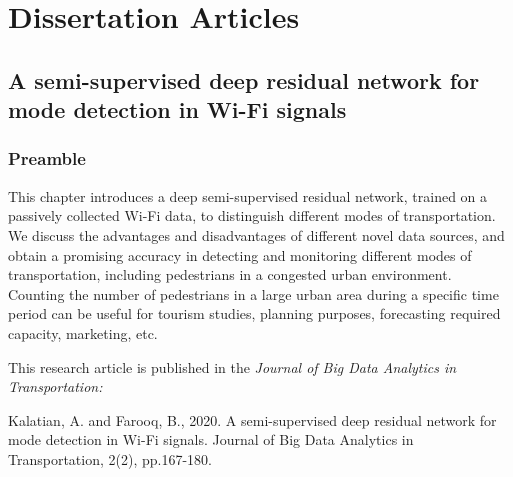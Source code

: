 \part{Dissertation Articles}
\label{part_2:dissertation_articles}
\chapter{A semi-supervised deep residual network for mode detection in Wi-Fi signals}
\label{chap2}
\thispagestyle{empty}
\pagebreak
\section*{Preamble}
This chapter introduces a deep semi-supervised residual network, trained on a passively collected Wi-Fi data, to distinguish different modes of transportation. We discuss the advantages and disadvantages of different novel data sources, and obtain a promising accuracy in detecting and monitoring different modes of transportation, including pedestrians in a congested urban environment. Counting the number of pedestrians in a large urban area during a specific time period can be useful for tourism studies, planning purposes, forecasting required capacity, marketing, etc.

\vspace{1em}
\noindent
This research article is published in the \textit{Journal of Big Data Analytics in Transportation:}

\vspace{1em}
\noindent
Kalatian, A. and Farooq, B., 2020. A semi-supervised deep residual network for mode detection in Wi-Fi signals. Journal of Big Data Analytics in Transportation, 2(2), pp.167-180.


\vspace{1em}
\noindent

\clearpage

